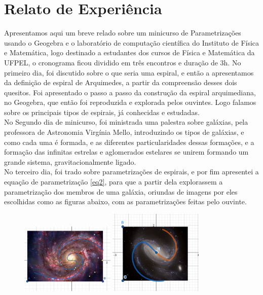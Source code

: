 \documentclass[twoside,a4paper,10pt]{article}
\begin{document}
\section{Relato de Experiência}
Apresentamos aqui um breve relado sobre um minicurso de Parametrizações usando o Geogebra e o laboratório de computação científica do Instituto de Física e Matemática, logo destinado a estudantes dos cursos de Física e Matemática da UFPEL, o cronograma ficou dividido em três encontros e duração de 3h. No primeiro dia, foi discutido sobre o que seria uma espiral, e então a apresentamos da definição de espiral de Arquimedes, a partir da compreensão desses dois quesitos. Foi apresentado o passo a passo da construção da espiral arquimediana, no Geogebra, que então foi reproduzida e explorada pelos ouvintes. Logo falamos sobre os principais tipos de espirais, já conhecidas e estudadas.\\
No Segundo dia de minicurso, foi ministrada uma palestra sobre galáxias, pela professora de Astronomia Virgínia Mello, introduzindo os tipos de galáxias, e como cada uma é formada, e as diferentes particularidades dessas formações, e a formação das infinitas estrelas e aglomerados estelares se unirem formando um grande sistema, gravitacionalmente ligado.\\
No terceiro dia, foi trado sobre parametrizações de espirais, e por fim apresentei a equação de parametrização \eqref{eq2}, para que a partir dela explorassem a parametrização dos membros de uma galáxia, oriundas de imagens por eles escolhidas como as figuras abaixo, com as parametrizações feitas pelo ouvinte.

\begin{figure}[!h]
	{\includegraphics[width=0.4\textwidth]{t1}}
	{\includegraphics[width=0.4\textwidth]{t2}}
\end{figure}
\clearpage
\end{document}
